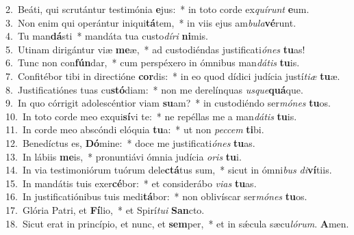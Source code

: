 {2.~}Beáti, qui scrutántur testimónia \textbf{e}jus:~* in toto corde ex\textit{quí}\textit{runt} \textbf{e}um.\\
{3.~}Non enim qui operántur iniqui\textbf{tá}tem,~* in viis ejus am\textit{bu}\textit{la}\textbf{vé}runt.\\
{4.~}Tu man\textbf{dá}sti~* mandáta tua custo\textit{dí}\textit{ri} \textbf{ni}mis.\\
{5.~}Utinam dirigántur viæ \textbf{me}æ,~* ad custodiéndas justificati\textit{ó}\textit{nes} \textbf{tu}as!\\
{6.~}Tunc non con\textbf{fún}dar,~* cum perspéxero in ómnibus man\textit{dá}\textit{tis} \textbf{tu}is.\\
{7.~}Confitébor tibi in directióne \textbf{cor}dis:~* in eo quod dídici judícia justí\textit{ti}\textit{æ} \textbf{tu}æ.\\
{8.~}Justificatiónes tuas cu\textbf{stó}diam:~* non me derelínquas \textit{us}\textit{que}\textbf{quá}que.\\
{9.~}In quo córrigit adolescéntior viam \textbf{su}am?~* in custodiéndo ser\textit{mó}\textit{nes} \textbf{tu}os.\\
{10.~}In toto corde meo exqui\textbf{sí}vi te:~* ne repéllas me a man\textit{dá}\textit{tis} \textbf{tu}is.\\
{11.~}In corde meo abscóndi elóquia \textbf{tu}a:~* ut non \textit{pec}\textit{cem} \textbf{ti}bi.\\
{12.~}Benedíctus es, \textbf{Dó}mine:~* doce me justificati\textit{ó}\textit{nes} \textbf{tu}as.\\
{13.~}In lábiis \textbf{me}is,~* pronuntiávi ómnia judícia \textit{o}\textit{ris} \textbf{tu}i.\\
{14.~}In via testimoniórum tuórum dele\textbf{ctá}tus sum,~* sicut in ómni\textit{bus} \textit{di}\textbf{ví}tiis.\\
{15.~}In mandátis tuis exer\textbf{cé}bor:~* et considerábo \textit{vi}\textit{as} \textbf{tu}as.\\
{16.~}In justificatiónibus tuis medi\textbf{tá}bor:~* non oblivíscar ser\textit{mó}\textit{nes} \textbf{tu}os.\\
{17.~}Glória Patri, et \textbf{Fí}lio,~* et Spirí\textit{tu}\textit{i} \textbf{San}cto.\\
{18.~}Sicut erat in princípio, et nunc, et \textbf{sem}per,~* et in sǽcula sæcu\textit{ló}\textit{rum}. \textbf{A}men.\\
